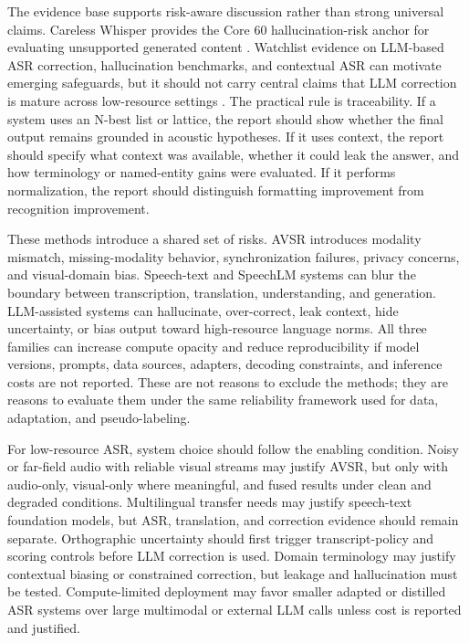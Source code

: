 \documentclass[pdflatex,sn-basic,iicol]{sn-jnl}
\theoremstyle{thmstyleone}
\theoremstyle{thmstyletwo}
\theoremstyle{thmstylethree}
\begin{document}
The evidence base supports risk-aware discussion rather than strong universal claims. Careless Whisper provides the Core 60 hallucination-risk anchor for evaluating unsupported generated content \citep{koenecke2024carelesswhisper}. Watchlist evidence on LLM-based ASR correction, hallucination benchmarks, and contextual ASR can motivate emerging safeguards, but it should not carry central claims that LLM correction is mature across low-resource settings \citep{ma2024asrerrorcorrection,koudounas2025shallow,wang2025contextasrbench}. The practical rule is traceability. If a system uses an N-best list or lattice, the report should show whether the final output remains grounded in acoustic hypotheses. If it uses context, the report should specify what context was available, whether it could leak the answer, and how terminology or named-entity gains were evaluated. If it performs normalization, the report should distinguish formatting improvement from recognition improvement.

These methods introduce a shared set of risks. AVSR introduces modality mismatch, missing-modality behavior, synchronization failures, privacy concerns, and visual-domain bias. Speech-text and SpeechLM systems can blur the boundary between transcription, translation, understanding, and generation. LLM-assisted systems can hallucinate, over-correct, leak context, hide uncertainty, or bias output toward high-resource language norms. All three families can increase compute opacity and reduce reproducibility if model versions, prompts, data sources, adapters, decoding constraints, and inference costs are not reported. These are not reasons to exclude the methods; they are reasons to evaluate them under the same reliability framework used for data, adaptation, and pseudo-labeling.

For low-resource ASR, system choice should follow the enabling condition. Noisy or far-field audio with reliable visual streams may justify AVSR, but only with audio-only, visual-only where meaningful, and fused results under clean and degraded conditions. Multilingual transfer needs may justify speech-text foundation models, but ASR, translation, and correction evidence should remain separate. Orthographic uncertainty should first trigger transcript-policy and scoring controls before LLM correction is used. Domain terminology may justify contextual biasing or constrained correction, but leakage and hallucination must be tested. Compute-limited deployment may favor smaller adapted or distilled ASR systems over large multimodal or external LLM calls unless cost is reported and justified.
\end{document}
